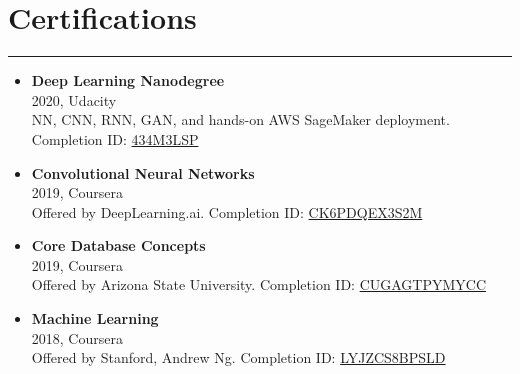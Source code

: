\documentclass[a4paper,10pt]{article}
\newcommand{\ressection}[1]{\section*{#1}\vspace{-0.5em}\hrule\vspace{0.5em}}
\newenvironment{myitemize}
  {\begin{itemize}[left=0pt,label=,itemsep=5pt]}
  {\end{itemize}}
\begin{document}
\ressection{Certifications}
\begin{myitemize}
    \item \textbf{Deep Learning Nanodegree} \\
          2020, Udacity \\
          NN, CNN, RNN, GAN, and hands-on AWS SageMaker deployment. Completion ID: \href{https://graduation.udacity.com/confirm/434M3LSP}{434M3LSP}
    \item \textbf{Convolutional Neural Networks} \\
          2019, Coursera \\
          Offered by DeepLearning.ai. Completion ID: \href{https://www.coursera.org/account/accomplishments/verify/CK6PDQEX3S2M}{CK6PDQEX3S2M}
    \item \textbf{Core Database Concepts} \\
          2019, Coursera \\
          Offered by Arizona State University. Completion ID: \href{https://www.coursera.org/account/accomplishments/verify/CUGAGTPYMYCC}{CUGAGTPYMYCC}
    \item \textbf{Machine Learning} \\
          2018, Coursera \\
          Offered by Stanford, Andrew Ng. Completion ID: \href{https://www.coursera.org/account/accomplishments/verify/LYJZCS8BPSLD}{LYJZCS8BPSLD}
\end{myitemize}
\end{document}
